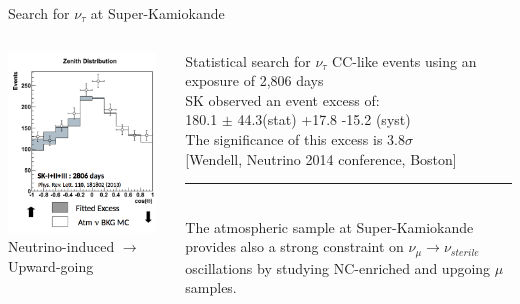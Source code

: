 \begin{frame}[t]{Search for $\nu_{\tau}$ at Super-Kamiokande}

\begin{columns}
  \begin{column}{0.47\textwidth}
    \includegraphics[width=0.95\textwidth]{./images/3nu/atmo/sk_tau_zenith.png}\\
    {\color{red} \small Neutrino-induced $\rightarrow$ Upward-going}\\
  \end{column}
  \begin{column}{0.53\textwidth}
     Statistical search for $\nu_{\tau}$ CC-like events using an exposure of 2,806 days\\
     \vspace{0.3cm}
     SK observed an event excess of:\\
     180.1 $\pm$ 44.3(stat) +17.8 -15.2 (syst)\\
     \vspace{0.3cm}
     The significance of this excess is 3.8$\sigma$\\
     \vspace{0.4cm}
     {\scriptsize \color{blue}[Wendell, Neutrino 2014 conference, Boston]}\\
     \noindent\rule{2cm}{0.4pt}\\
     {\small
        The atmospheric sample at Super-Kamiokande provides also a strong
        constraint on $\nu_{\mu} \rightarrow \nu_{sterile}$ oscillations
        by studying NC-enriched and upgoing $\mu$ samples.
     }
  \end{column}
\end{columns}
\end{frame}


